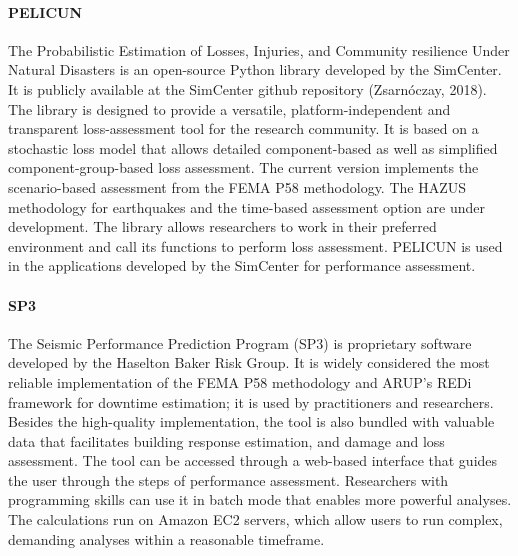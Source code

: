 \paragraph{PELICUN} The Probabilistic Estimation of Losses, Injuries, and Community resilience Under Natural Disasters is an open-source Python library developed by the SimCenter. It is publicly available at the SimCenter github repository (Zsarnóczay, 2018). The library is designed to provide a versatile, platform-independent and transparent loss-assessment tool for the research community. It is based on a stochastic loss model that allows detailed component-based as well as simplified component-group-based loss assessment. The current version implements the scenario-based assessment from the FEMA P58 methodology. The HAZUS methodology for earthquakes and the time-based assessment option are under development. The library allows researchers to work in their preferred environment and call its functions to perform loss assessment. PELICUN is used in the applications developed by the SimCenter for performance assessment.

\paragraph{SP3} The Seismic Performance Prediction Program (SP3) is proprietary software developed by the Haselton Baker Risk Group. It is widely considered the most reliable implementation of the FEMA P58 methodology and ARUP’s REDi framework for downtime estimation; it is used by practitioners and researchers. Besides the high-quality implementation, the tool is also bundled with valuable data that facilitates building response estimation, and damage and loss assessment. The tool can be accessed through a web-based interface that guides the user through the steps of performance assessment. Researchers with programming skills can use it in batch mode that enables more powerful analyses. The calculations run on Amazon EC2 servers, which allow users to run complex, demanding analyses within a reasonable timeframe.
